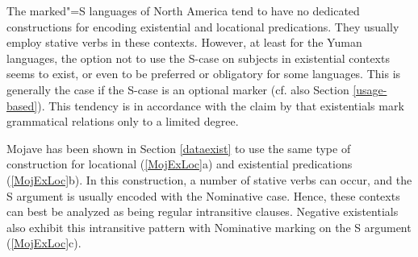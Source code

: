 The marked"=S languages of North America tend to have no dedicated constructions for encoding existential and locational predications. 
They usually employ stative verbs in these contexts. 
However, at least for the Yuman languages, the option not to use the S-case on subjects in existential contexts seems to exist, or even to be preferred or obligatory for some languages. This is generally the case if the S-case is an optional marker (cf. also Section \ref{usage-based}). 
This tendency is in accordance with the claim by \citet[123]{Payne:1997} that existentials mark grammatical relations only to a limited degree.

Mojave has been shown in Section \ref{dataexist} to use the same type of construction for locational (\ref{MojExLoc}a) and existential predications (\ref{MojExLoc}b).
In this construction, a number of stative verbs can occur, and the S argument is usually encoded with the Nominative case. 
Hence, these contexts can best be analyzed as being regular intransitive clauses.
Negative existentials also exhibit this intransitive pattern with Nominative marking on the S argument (\ref{MojExLoc}c).  



